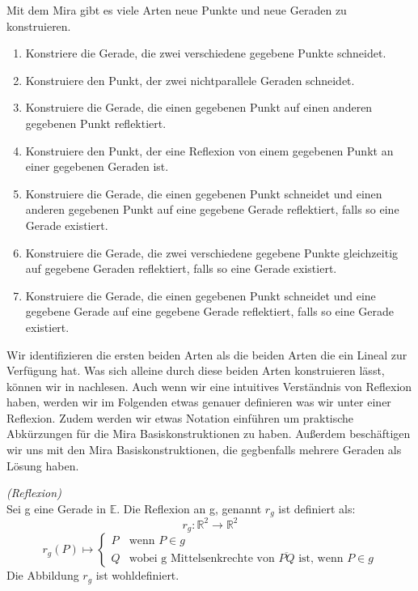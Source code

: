 \begin{remark}
    \label{rem:mira}
    Mit dem Mira gibt es viele Arten neue Punkte und neue Geraden  zu konstruieren.
    \begin{enumerate}[label=\textup{(}\roman*.\textup{)}]
        \item Konstriere die Gerade, die zwei verschiedene gegebene Punkte schneidet.
        \item Konstruiere den Punkt, der zwei nichtparallele Geraden schneidet.
        \item Konstruiere die Gerade, die einen gegebenen Punkt auf einen anderen gegebenen Punkt reflektiert.
        \item Konstruiere den Punkt, der eine Reflexion von einem gegebenen Punkt an einer gegebenen Geraden ist.
        \item Konstruiere die Gerade, die einen gegebenen Punkt schneidet und einen anderen gegebenen Punkt auf eine gegebene Gerade reflektiert, falls so eine Gerade existiert.
        \item Konstruiere die Gerade, die zwei verschiedene gegebene Punkte gleichzeitig auf gegebene Geraden reflektiert, falls so eine Gerade existiert.
        \item Konstruiere die Gerade, die einen gegebenen Punkt schneidet und eine gegebene Gerade auf eine gegebene Gerade reflektiert, falls so eine Gerade existiert.
    \end{enumerate}

    Wir identifizieren die ersten beiden Arten als die beiden Arten die ein Lineal zur Verfügung hat.
    Was sich alleine durch diese beiden Arten konstruieren lässt, können wir in \cite{Vogel} nachlesen.
    Auch wenn wir eine intuitives Verständnis von Reflexion haben, werden wir im Folgenden etwas genauer definieren was wir unter einer Reflexion. Zudem werden wir etwas Notation einführen um praktische Abkürzungen für die Mira Basiskonstruktionen zu haben. Außerdem beschäftigen wir uns mit den Mira Basiskonstruktionen, die gegbenfalls mehrere Geraden als Lösung haben.
\end{remark}
\begin{definition} 
    \textit{(Reflexion)} \\
    \label{def:reflexion}
    Sei g eine Gerade in $\mathbb{E}$. Die Reflexion an g, genannt $r_g$ ist definiert als:
    $$r_g: \mathbb{R}^2 \longrightarrow \mathbb{R}^2$$
    $$r_g(P) \longmapsto \begin{cases}
    P & \text{wenn } P \in g \\
    Q & \text{wobei g Mittelsenkrechte von } \overline{PQ} \text{ ist, wenn } P \in g
    \end{cases}
    $$
    Die Abbildung $r_g$ ist wohldefiniert.
\end{definition}

